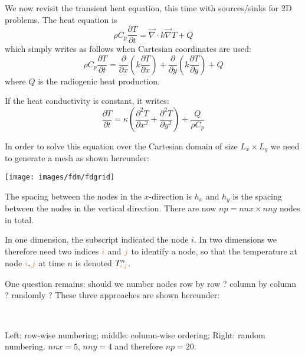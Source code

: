 We now revisit the transient heat equation, this time with sources/sinks for 2D problems.
The heat equation is 
\[
\rho C_p \frac{\partial T}{\partial t} =
\vec\nabla \cdot k \vec\nabla T + Q 
\]
which simply writes as follows when Cartesian coordinates are used:
\[
\rho C_p \frac{\partial T}{\partial t} = 
\frac{\partial }{\partial x} \left(  k  \frac{\partial T}{\partial x} \right)+
\frac{\partial }{\partial y} \left(  k  \frac{\partial T}{\partial y} \right)+
Q
\]
where $Q$ is the radiogenic heat production.

If the heat conductivity is constant, it writes:
\[
\frac{\partial T}{\partial t} =
\kappa \left(  \frac{\partial^2 T}{\partial x^2} +   \frac{\partial^2 T}{\partial y^2} \right)+
\frac{Q}{\rho C_p}
\]

In order to solve this equation over the Cartesian domain of size $L_x \times L_y$
we need to generate a mesh as shown hereunder:
\begin{center}
\texttt{[image: images/fdm/fdgrid]}
\end{center}
The spacing between the nodes in the $x$-direction is $h_x$ and $h_y$ is the spacing
between the nodes in the vertical direction. There are now $np=nnx\times nny$ nodes in total.

In one dimension, the subscript indicated the node $i$. In two dimensions we therefore 
need two indices ${\color{brown}i}$ and ${\color{brown}j}$ 
to identify a node, so that the temperature at node ${\color{brown}i},{\color{brown}j}$ 
at time $n$ is denoted $T_{{\color{brown}i,j}}^n$.

One question remains: should we number nodes 
row by row ? column by column ? randomly ? 
These three approaches are shown hereunder: 

\vspace{.5cm}

\begin{minipage}[t]{\textwidth}
\\
\begin{center}
{\captionfont Left: row-wise numbering; middle: column-wise ordering; Right: random numbering.
$nnx=5$, $nny=4$ and therefore $np=20$.
}
\end{center}
\end{minipage}

\vspace{.5cm}

